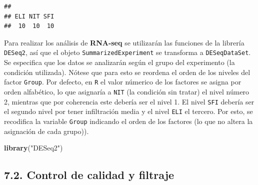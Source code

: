 \documentclass[
]{article}
\newenvironment{Shaded}{\begin{snugshade}}{\end{snugshade}}
\newcommand{\DataTypeTok}[1]{\textcolor[rgb]{0.13,0.29,0.53}{#1}}
\newcommand{\KeywordTok}[1]{\textcolor[rgb]{0.13,0.29,0.53}{\textbf{#1}}}
\newcommand{\NormalTok}[1]{#1}
\newcommand{\OperatorTok}[1]{\textcolor[rgb]{0.81,0.36,0.00}{\textbf{#1}}}
\newcommand{\StringTok}[1]{\textcolor[rgb]{0.31,0.60,0.02}{#1}}
\begin{document}
\begin{Shaded}
\end{Shaded}

\begin{verbatim}
## 
## ELI NIT SFI 
##  10  10  10
\end{verbatim}

Para realizar los análisis de \textbf{RNA-seq} se utilizarán las
funciones de la librería \texttt{DESeq2}, así que el objeto
\texttt{SummarizedExperiment} se transforma a \texttt{DESeqDataSet}. Se
especifica que los datos se analizarán según el grupo del experimento
(la condición utilizada). Nótese que para esto se reordena el orden de
los niveles del factor \texttt{Group}. Por defecto, en \texttt{R} el
valor númerico de los factores se asigna por orden alfabético, lo que
asignaría a \texttt{NIT} (la condición sin tratar) el nivel número 2,
mientras que por coherencia este debería ser el nivel 1. El nivel
\texttt{SFI} debería ser el segundo nivel por tener infiltración media y
el nivel \texttt{ELI} el tercero. Por esto, se recodifica la variable
\texttt{Group} indicando el orden de los factores (lo que no altera la
asignación de cada grupo)).

\begin{Shaded}
\begin{Highlighting}[]
\KeywordTok{library}\NormalTok{(}\StringTok{"DESeq2"}\NormalTok{)}
\end{Highlighting}
\end{Shaded}

\begin{Shaded}
\end{Shaded}

\hypertarget{control-de-calidad-y-filtraje}{%
\subsection{7.2. Control de calidad y
filtraje}\label{control-de-calidad-y-filtraje}}
\end{document}

